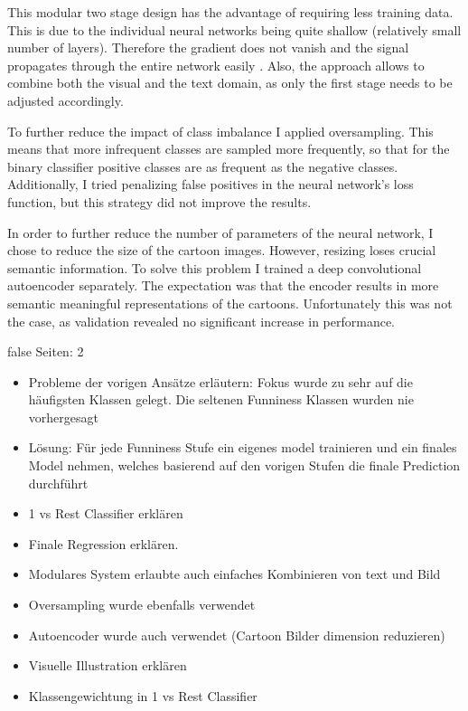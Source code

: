 \documentclass[draft,final,oneside]{vutinfth} %
\begin{document}
This modular two stage design has the advantage of requiring less training data. This is due to the individual neural networks being quite shallow (relatively small number of layers). Therefore the gradient does not vanish and the signal propagates through the entire network easily \cite{vanishinggradient}. Also, the approach allows to combine both the visual and the text domain, as only the first stage needs to be adjusted accordingly.

To further reduce the impact of class imbalance I applied oversampling. This means that more infrequent classes are sampled more frequently, so that for the binary classifier positive classes are as frequent as the negative classes. Additionally, I tried penalizing false positives in the neural network's loss function, but this strategy did not improve the results.

In order to further reduce the number of parameters of the neural network, I chose to reduce the size of the cartoon images. However, resizing loses crucial semantic information. To solve this problem I trained a deep convolutional autoencoder separately. The expectation was that the encoder results in more semantic meaningful representations of the cartoons. Unfortunately this was not the case, as validation revealed no significant increase in performance.


\if false
Seiten: 2

\begin{itemize}

\item Probleme der vorigen Ansätze erläutern: Fokus wurde zu sehr auf die häufigsten Klassen gelegt. Die seltenen Funniness Klassen wurden nie vorhergesagt
\item Lösung: Für jede Funniness Stufe ein eigenes model trainieren und ein finales Model nehmen, welches basierend auf den vorigen Stufen die finale Prediction durchführt
\item 1 vs Rest Classifier erklären
\item Finale Regression erklären.
\item Modulares System erlaubte auch einfaches Kombinieren von text und Bild
\item Oversampling wurde ebenfalls verwendet
\item Autoencoder wurde auch verwendet (Cartoon Bilder dimension reduzieren)
\item Visuelle Illustration erklären
\item Klassengewichtung in 1 vs Rest Classifier

\end{itemize}
\end{document}
